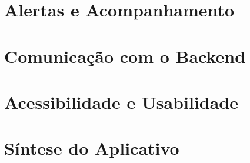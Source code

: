 
\section{Alertas e Acompanhamento}
\label{sec:alertas-acompanhamento}


\section{Comunicação com o Backend}
\label{sec:comunicacao-aplicativo-backend}


\section{Acessibilidade e Usabilidade}
\label{sec:acessibilidade-usabilidade}


\section{Síntese do Aplicativo}
\label{sec:sintese-aplicativo}

